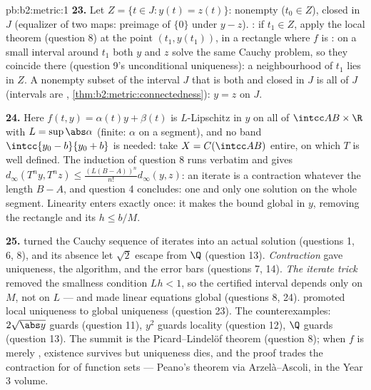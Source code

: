 \begin{solution}{pb:b2:metric:1}
\textbf{23.} Let $Z = \{t \in J : y(t) = z(t)\}$: nonempty
($t_0 \in Z$), closed in $J$ (equalizer of two  maps:
preimage of $\{0\}$ under $y - z$). : if $t_1 \in Z$, apply
the local theorem (question 8) at the point $(t_1, y(t_1))$,
in a rectangle where $f$ is : on a small interval
around $t_1$ both $y$ and $z$ solve the same Cauchy problem, so
they coincide there (question 9's unconditional uniqueness):
a neighbourhood of $t_1$ lies in $Z$. A nonempty subset of the
interval $J$ that is both  and closed in $J$ is all of $J$
(intervals are ,
\cref{thm:b2:metric:connectedness}): $y = z$ on $J$.

\textbf{24.} Here $f(t, y) = \alpha(t)y + \beta(t)$ is
$L$-Lipschitz in $y$ on all of $\intcc AB \times \R$ with $L =
\sup\abs\alpha$ (finite: $\alpha$  on a segment), and
no band $\intcc{y_0 - b}{y_0 + b}$ is needed: take $X = C(\intcc
AB)$ entire, on which $T$ is well defined. The induction of
question 8 runs verbatim and gives $d_\infty(T^ny, T^nz) \leq
\frac{(L(B - A))^n}{n!}d_\infty(y, z)$: an iterate is a
contraction whatever the length $B - A$, and question 4
concludes: one and only one solution on the whole segment.
Linearity enters exactly once: it makes the  bound
global in $y$, removing the rectangle and its $h \leq b/M$.

\textbf{25.} \emph{} turned the Cauchy sequence of
iterates into an actual solution (questions 1, 6, 8), and its
absence let $\sqrt2$ escape from $\Q$ (question 13).
\emph{Contraction} gave uniqueness, the algorithm, and the
error bars (questions 7, 14). \emph{The iterate trick} removed
the smallness condition $Lh < 1$, so the certified interval
depends only on $M$, not on $L$ --- and made linear equations
global (questions 8, 24). \emph{} promoted local
uniqueness to global uniqueness (question 23). The
counterexamples: $2\sqrt{\abs y}$ guards  (question
11), $y^2$ guards locality (question 12), $\Q$ guards
 (question 13). The summit is the
Picard--Lindel\"of theorem (question 8); when $f$ is merely
, existence survives but uniqueness dies, and the
proof trades the contraction for  of function sets
--- Peano's theorem via Arzel\`a--Ascoli, in the Year 3
volume.
\end{solution}
